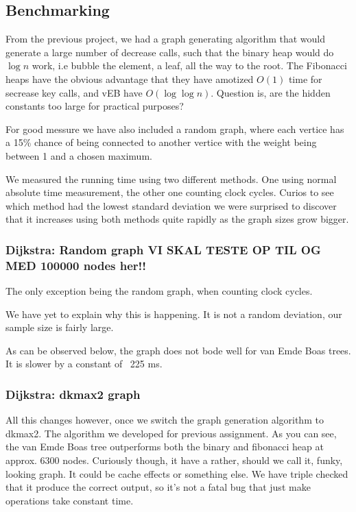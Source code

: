 \subsection*{Benchmarking}
From the previous project, we had a graph generating algorithm that would generate a large number of decrease calls, such that the binary heap would do $\log n$ work, i.e bubble the element, a leaf, all the way to the root. The Fibonacci heaps have the obvious advantage that they have amotized $O(1)$ time for secrease key calls, and vEB have $O(\log \log n)$. Question is, are the hidden constants too large for practical purposes?

For good messure we have also included a random graph, where each vertice has a 15\% chance of being connected to another vertice with the weight being between 1 and a chosen maximum.

We measured the running time using two different methods. One using normal absolute time measurement, the other one counting clock cycles. Curios to see which method had the lowest standard deviation we were surprised to discover that it increases using both methods quite rapidly as the graph sizes grow bigger.\newline

\subsubsection*{Dijkstra: Random graph VI SKAL TESTE OP TIL OG MED 100000 nodes her!!}


The only exception being the random graph, when counting clock cycles.\newline


We have yet to explain why this is happening. It is not a random deviation, our sample size is fairly large.\newline


As can be observed below, the graph does not bode well for van Emde Boas trees. It is slower by a constant of ~225 ms.\newline


\subsubsection*{Dijkstra: dkmax2 graph}
All this changes however, once we switch the graph generation algorithm to dkmax2. The algorithm we developed for previous assignment. As you can see, the van Emde Boas tree outperforms both the binary and fibonacci heap at approx. 6300 nodes. Curiously though, it have a rather, should we call it, funky, looking graph. It could be cache effects or something else. We have triple checked that it produce the correct output, so it's not a fatal bug that just make operations take constant time.\newline

